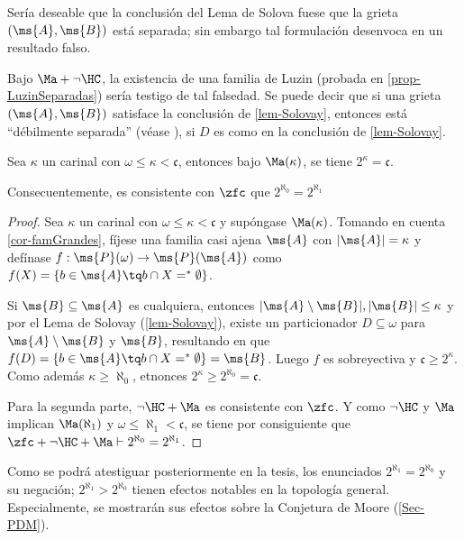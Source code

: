 	Sería deseable que la conclusión del Lema de Solova fuese que la grieta $(\ms{A},\ms{B})$ está separada; sin embargo tal formulación desenvoca en un resultado falso.
	
	Bajo $\Ma + \lnot\HC$, la existencia de una familia de Luzin (probada en \ref{prop-LuzinSeparadas}) sería testigo de tal falsedad. Se puede decir que si una grieta $(\ms{A},\ms{B})$ satisface la conclusión de \ref{lem-Solovay}, entonces está ``débilmente separada'' (véase \cite[\S~ 3.2]{hruAlmost}), si $D$ es como en la conclusión de \ref{lem-Solovay}.


	\begin{corolario}
		Sea $\kappa$ un carinal con $\omega \leq \kappa <\mathfrak{c}$, entonces bajo $\Ma(\kappa)$, se tiene $2^\kappa=\mathfrak{c}$.

		Consecuentemente, es consistente con $\zfc$ que $2^{\aleph_0}=2^{\aleph_1}$
	\end{corolario}

	\begin{proof}
		Sea $\kappa$ un carinal con $\omega \leq \kappa <\mathfrak{c}$ y supóngase $\Ma(\kappa)$. Tomando en cuenta \ref{cor-famGrandes}, fíjese una familia casi ajena $\ms{A}$ con $|\ms{A}|=\kappa$ y defínase $f:\ms{P}(\omega) \to \ms{P}(\ms{A})$ como $ f(X)=\{ b \in \ms{A} \tq b \cap X =^* \emptyset \} $.

		Si $\ms{B} \subseteq \ms{A}$ es cualquiera, entonces $|\ms{A} \setminus \ms{B}|, |\ms{B}| \leq \kappa$ y por el Lema de Solovay (\ref{lem-Solovay}), existe un particionador $D \subseteq \omega$ para $\ms{A} \setminus \ms{B}$ y $\ms{B}$, resultando en que $ f(D)=\{b \in \ms{A} \tq b \cap X =^* \emptyset \} = \ms{B} $. Luego $f$ es sobreyectiva y $\mathfrak{c} \geq 2^\kappa $. Como además $\kappa \geq \aleph_0$, etnonces $2^\kappa \geq 2^{\aleph_0}=\mathfrak{c}$.

		Para la segunda parte, $\lnot \HC + \Ma$ es consistente con $\zfc$. Y como $\lnot \HC$ y $\Ma$ implican $\Ma(\aleph_1)$ y $\omega \leq \aleph_1 < \mathfrak{c}$, se tiene por consiguiente que $\zfc+\lnot \HC + \Ma \vdash 2^{\aleph_0}=2^{\aleph_1}$.
	\end{proof}

	Como se podrá atestiguar posteriormente en la tesis, los enunciados $2^{\aleph_1} = 2^{\aleph_0}$ y su negación; $2^{\aleph_1} > 2^{\aleph_0}$ tienen efectos notables en la topología general. Especialmente, se mostrarán sus efectos sobre la Conjetura de Moore (\autoref{Sec-PDM}).